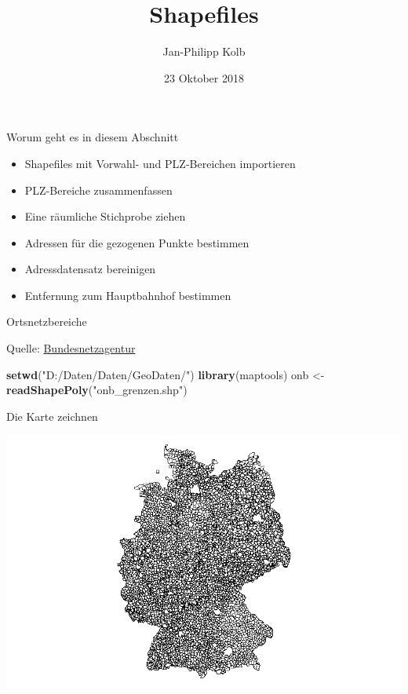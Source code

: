 \documentclass[ignorenonframetext,]{beamer}
\title{Shapefiles}
\author{Jan-Philipp Kolb}
\date{23 Oktober 2018}
\newenvironment{Shaded}{\begin{snugshade}}{\end{snugshade}}
\newcommand{\KeywordTok}[1]{\textcolor[rgb]{0.13,0.29,0.53}{\textbf{#1}}}
\newcommand{\NormalTok}[1]{#1}
\newcommand{\StringTok}[1]{\textcolor[rgb]{0.31,0.60,0.02}{#1}}
\providecommand{\tightlist}{%
  \setlength{\itemsep}{0pt}\setlength{\parskip}{0pt}}
\begin{document}
\frame{\titlepage}

\begin{frame}{Worum geht es in diesem Abschnitt}
\protect\hypertarget{worum-geht-es-in-diesem-abschnitt}{}

\begin{itemize}
\tightlist
\item
  Shapefiles mit Vorwahl- und PLZ-Bereichen importieren
\item
  PLZ-Bereiche zusammenfassen
\item
  Eine räumliche Stichprobe ziehen
\item
  Adressen für die gezogenen Punkte bestimmen
\item
  Adressdatensatz bereinigen
\item
  Entfernung zum Hauptbahnhof bestimmen
\end{itemize}

\end{frame}

\begin{frame}[fragile]{Ortsnetzbereiche}
\protect\hypertarget{ortsnetzbereiche}{}

Quelle:
\href{http://www.bundesnetzagentur.de/DE/Sachgebiete/Telekommunikation/Unternehmen_Institutionen/Nummerierung/Rufnummern/ONVerzeichnisse/GISDaten_ONBGrenzen/ONBGrenzen_Basepage.html}{Bundesnetzagentur}

\begin{Shaded}
\begin{Highlighting}[]
\KeywordTok{setwd}\NormalTok{(}\StringTok{"D:/Daten/Daten/GeoDaten/"}\NormalTok{)}
\KeywordTok{library}\NormalTok{(maptools)}
\NormalTok{onb <-}\StringTok{ }\KeywordTok{readShapePoly}\NormalTok{(}\StringTok{"onb_grenzen.shp"}\NormalTok{)}
\end{Highlighting}
\end{Shaded}

\end{frame}

\begin{frame}{Die Karte zeichnen}
\protect\hypertarget{die-karte-zeichnen}{}

\includegraphics{figure/onbGermany.png}

\end{frame}
\end{document}
